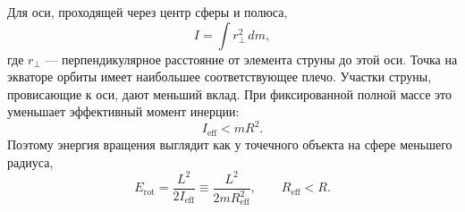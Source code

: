 Для оси, проходящей через центр сферы и полюса,
\begin{equation}
  I=\int r_\perp^2\,dm,
  \label{eq:l09-extended-inertia}
\end{equation}
где \(r_\perp\) — перпендикулярное расстояние от элемента струны до этой оси. Точка на экваторе орбиты имеет наибольшее соответствующее плечо. Участки струны, провисающие к оси, дают меньший вклад. При фиксированной полной массе это уменьшает эффективный момент инерции:
\begin{equation}
  I_{\mathrm{eff}}<mR^2.
  \label{eq:l09-inertia-reduction}
\end{equation}
Поэтому энергия вращения выглядит как у точечного объекта на сфере меньшего радиуса,
\begin{equation}
  E_{\mathrm{rot}}
  =\frac{L^2}{2I_{\mathrm{eff}}}
  \equiv \frac{L^2}{2mR_{\mathrm{eff}}^2},
  \qquad R_{\mathrm{eff}}<R.
  \label{eq:l09-effective-radius}
\end{equation}

\begin{classroomqa}
\end{classroomqa}

